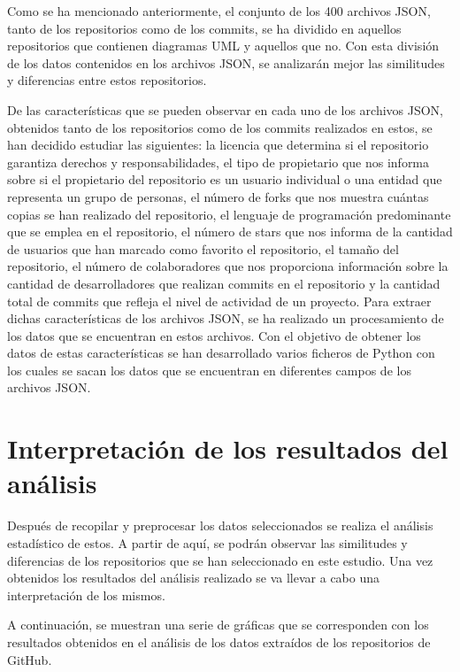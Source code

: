 \documentclass[a4paper, 12pt]{book}
\begin{document}
Como se ha mencionado anteriormente, el conjunto de los 400 archivos JSON, tanto de los repositorios como de los commits, se ha dividido en aquellos repositorios que contienen diagramas UML y aquellos que no. 
Con esta división de los datos contenidos en los archivos JSON, se analizarán mejor las similitudes y diferencias entre estos repositorios. 


De las características que se pueden observar en cada uno de los archivos JSON, obtenidos tanto de los repositorios como de los commits realizados en estos, se han decidido estudiar las siguientes:
la licencia que determina si el repositorio garantiza derechos y responsabilidades, el tipo de propietario que nos informa sobre si el propietario del repositorio es un usuario individual o una entidad que representa un grupo de personas, 
el número de forks que nos muestra cuántas copias se han realizado del repositorio, el lenguaje de programación predominante que se emplea en el repositorio, el número de stars que nos informa de la cantidad de usuarios que han marcado como favorito el repositorio, 
el tamaño del repositorio, el número de colaboradores que nos proporciona información sobre la cantidad de desarrolladores que realizan commits en el repositorio y la cantidad total de commits que refleja el nivel de actividad de un proyecto.
Para extraer dichas características de los archivos JSON, se ha realizado un procesamiento de los datos que se encuentran en estos archivos.
Con el objetivo de obtener los datos de estas características se han desarrollado varios ficheros de Python con los cuales se sacan los datos que se encuentran en diferentes campos de los archivos JSON.


\section{Interpretación de los resultados del análisis}
\label{sec:interpretación de los resultados del análisis}

Después de recopilar y preprocesar los datos seleccionados se realiza el análisis estadístico de estos.
A partir de aquí, se podrán observar las similitudes y diferencias de los repositorios que se han seleccionado en este estudio.
Una vez obtenidos los resultados del análisis realizado se va llevar a cabo una interpretación de los mismos.


A continuación, se muestran una serie de gráficas que se corresponden con los resultados obtenidos en el análisis de los datos extraídos de los repositorios de GitHub.
\end{document}
